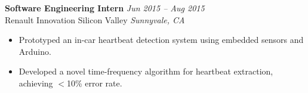 \vspace{0.3em}
\textbf{\sffamily Software Engineering Intern} \hfill \textit{Jun 2015 -- Aug 2015} \\
{\sffamily Renault Innovation Silicon Valley} \hfill \textit{Sunnyvale, CA}
\vspace{0.1em}

\begin{itemize}[leftmargin=*, topsep=2pt, partopsep=2.5pt]
\setlength\itemsep{0.3em}
\item Prototyped an in-car heartbeat detection system using embedded sensors and Arduino.
\item Developed a novel time-frequency algorithm for heartbeat extraction, achieving $<$10\% error rate.
\end{itemize}
